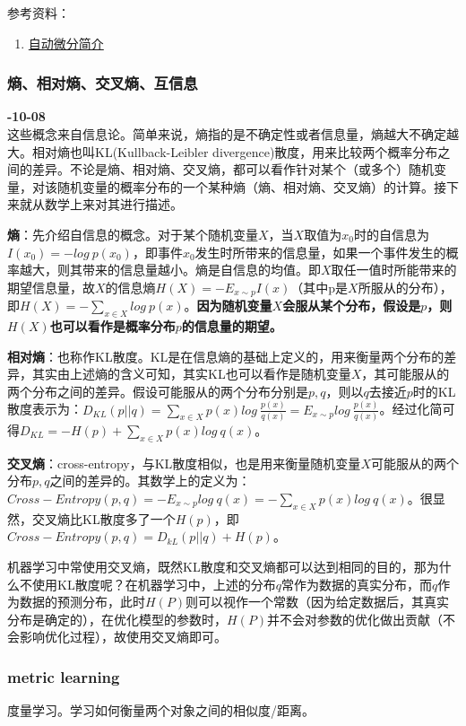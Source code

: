 参考资料：
\begin{enumerate}
    \item \href{https://blog.csdn.net/aws3217150/article/details/70214422}{自动微分简介}
\end{enumerate}


\subsubsection{熵、相对熵、交叉熵、互信息} 
\textbf{-10-08}\\
这些概念来自信息论\cite{6773024}。简单来说，熵指的是不确定性或者信息量，熵越大不确定越大。相对熵也叫KL(Kullback-Leibler divergence)散度，用来比较两个概率分布之间的差异。不论是熵、相对熵、交叉熵，都可以看作针对某个（或多个）随机变量，对该随机变量的概率分布的一个某种熵（熵、相对熵、交叉熵）的计算。接下来就从数学上来对其进行描述。

\textbf{熵}：先介绍自信息的概念。对于某个随机变量$X$，当$X$取值为$x_0$时的自信息为$I(x_0) = -log\ p(x_0)$，即事件$x_0$发生时所带来的信息量，如果一个事件发生的概率越大，则其带来的信息量越小。熵是自信息的均值。即$X$取任一值时所能带来的期望信息量，故$X$的信息熵$H(X) = -E_{x\sim p}I(x)$（其中p是$X$所服从的分布），即$H(X) = -\sum_{x \in X}log\ p(x)$。\textbf{因为随机变量$X$会服从某个分布，假设是$p$，则$H(X)$也可以看作是概率分布$p$的信息量的期望。}

\textbf{相对熵}：也称作KL散度。KL是在信息熵的基础上定义的，用来衡量两个分布的差异，其实由上述熵的含义可知，其实KL也可以看作是随机变量$X$，其可能服从的两个分布之间的差异。假设可能服从的两个分布分别是$p, q$，则以$q$去接近$p$时的KL散度表示为：$D_{KL}(p||q) = \sum_{x \in X} p(x) log\ \frac{p(x)}{q(x)} = E_{x\sim p} log\ \frac{p(x)}{q(x)}$。经过化简可得$D_{KL} = -H(p) + \sum_{x \in X}p(x)log\ q(x)$。

\textbf{交叉熵}：\label{ce}cross-entropy，与KL散度相似，也是用来衡量随机变量$X$可能服从的两个分布$p, q$之间的差异的。其数学上的定义为：$Cross-Entropy(p, q) = -E_{x\sim p} log\ q(x) = - \sum_{x \in X}p(x)log\ q(x)$。很显然，交叉熵比KL散度多了一个$H(p)$，即$Cross-Entropy(p, q) = D_{kL}(p || q) + H(p)$。

机器学习中常使用交叉熵，既然KL散度和交叉熵都可以达到相同的目的，那为什么不使用KL散度呢？在机器学习中，上述的分布$q$常作为数据的真实分布，而$q$作为数据的预测分布，此时$H(P)$则可以视作一个常数（因为给定数据后，其真实分布是确定的），在优化模型的参数时，$H(P)$并不会对参数的优化做出贡献（不会影响优化过程），故使用交叉熵即可。

\subsubsection{metric learning} 
度量学习。学习如何衡量两个对象之间的相似度/距离。


